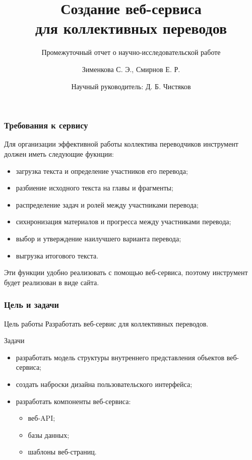 \documentclass[hyperref={unicode}]{beamer}
\title[%
		Сайт для переводов
]{%
		Создание веб-сервиса\\ 
		для коллективных переводов
}
\subtitle{Промежуточный отчет о научно-исследовательской работе}
\author[%
		Зименкова С., Смирнов Е.
]{%
		Зименкова С. Э., Смирнов Е. Р.
}
\date[%
		25.12.2022
]{%
		Научный руководитель: Д. Б. Чистяков
}
\institute[%
		ПетрГУ
]{%
		Петрозаводский государственный университет\\
		Кафедра Информатики и Математического Обеспечения
}
\begin{document}
\begin{frame}
\maketitle
\end{frame}

\begin{frame}
	\frametitle{Требования к сервису}
	Для организации эффективной работы коллектива переводчиков инструмент должен иметь следующие фукнции:
 \begin{itemize}
		\item загрузка текста и определение участников его перевода;
		\item разбиение исходного текста на главы и фрагменты;
		\item распределение задач и ролей между участниками перевода;
		\item сихнронизация материалов и прогресса между участниками перевода;
		\item выбор и утверждение наилучшего варианта перевода;
		\item выгрузка итогового текста.
	\end{itemize}
	
	Эти функции удобно реализовать с помощью веб-сервиса, поэтому инструмент будет реализован в виде сайта.
	
	
	
\end{frame}

\begin{frame}
	\frametitle{Цель и задачи}
	\begin{block}{Цель работы}
		Разработать веб-сервис для коллективных переводов.
	\end{block}
	\begin{block}{Задачи}
	\begin{itemize}
		\item разработать модель структуры внутреннего представления объектов веб-сервиса;
		\item создать наброски дизайна пользовательского интерфейса;
		\item разработать компоненты веб-сервиса:
		\begin{itemize}
			\item веб-API;
			\item базы данных;
			\item шаблоны веб-страниц.
		\end{itemize}
	\end{itemize}
	\end{block}
\end{frame}
\end{document}
